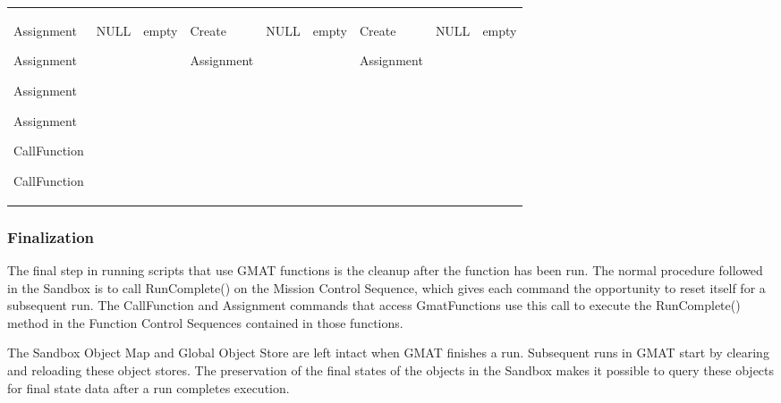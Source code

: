 \begin{center}
\begin{supertabular}{|p{0.75in}|p{0.45in}|p{0.45in}|p{0.69in}|p{0.45in}|p{0.45in}|p{0.69in}|
p{0.44in}|p{0.44in}|}
\begin{small}
Assignment

Assignment

Assignment

Assignment

CallFunction

CallFunction
\end{small} &
\begin{small}
NULL
\end{small} &
\begin{small}
empty
\end{small} &
\begin{small}
Create

Assignment
\end{small} &
\begin{small}
NULL
\end{small} &
\begin{small}
empty\end{small} &
\begin{small}
Create

Assignment
\end{small} &
\begin{small}
NULL
\end{small} &
\begin{small}
empty
\end{small} \\
\end{supertabular}
\end{center}

\subsubsection{Finalization}
The final step in running scripts that use GMAT functions is the cleanup after the function has been
run.  The normal procedure followed in the Sandbox is to call RunComplete() on the Mission Control
Sequence, which gives each command the opportunity to reset itself for a subsequent run.  The
CallFunction and Assignment commands that access GmatFunctions use this call to execute the
RunComplete() method in the Function Control Sequences contained in those functions.

The Sandbox Object Map and Global Object Store are left intact when GMAT finishes a run.  Subsequent
runs in GMAT start by clearing and reloading these object stores.  The preservation of the final
states of the objects in the Sandbox makes it possible to query these objects for final state data
after a run completes execution.

